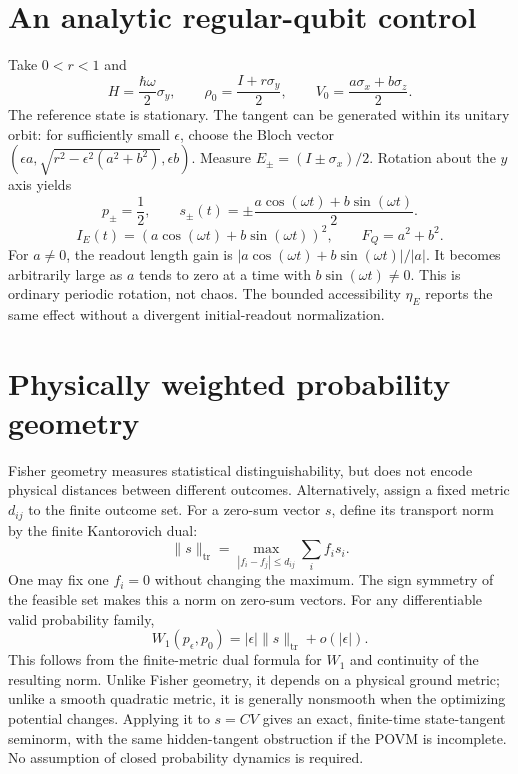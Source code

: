 \documentclass[11pt,a4paper]{article}
\begin{document}
\section{An analytic regular-qubit control}
Take $0<r<1$ and
\[H=\frac{\hbar\omega}{2}\sigma_y,\qquad\rho_0=\frac{I+r\sigma_y}{2},\qquad V_0=\frac{a\sigma_x+b\sigma_z}{2}.\]
The reference state is stationary. The tangent can be generated within its unitary orbit: for sufficiently small $\epsilon$, choose the Bloch vector $(\epsilon a,\sqrt{r^2-\epsilon^2(a^2+b^2)},\epsilon b)$. Measure $E_\pm=(I\pm\sigma_x)/2$. Rotation about the $y$ axis yields
\[p_\pm=\frac12,\qquad s_\pm(t)=\pm\frac{a\cos(\omega t)+b\sin(\omega t)}{2}.\]
\[I_E(t)=(a\cos(\omega t)+b\sin(\omega t))^2,\qquad F_Q=a^2+b^2.\]
For $a\ne0$, the readout length gain is $|a\cos(\omega t)+b\sin(\omega t)|/|a|$. It becomes arbitrarily large as $a$ tends to zero at a time with $b\sin(\omega t)\ne0$. This is ordinary periodic rotation, not chaos. The bounded accessibility $\eta_E$ reports the same effect without a divergent initial-readout normalization.
\section{Physically weighted probability geometry}
Fisher geometry measures statistical distinguishability, but does not encode physical distances between different outcomes. Alternatively, assign a fixed metric $d_{ij}$ to the finite outcome set. For a zero-sum vector $s$, define its transport norm by the finite Kantorovich dual:
\[\|s\|_{\mathrm{tr}}=\max_{|f_i-f_j|\leq d_{ij}}\sum_i f_i s_i.\]
One may fix one $f_i=0$ without changing the maximum. The sign symmetry of the feasible set makes this a norm on zero-sum vectors. For any differentiable valid probability family,
\[W_1(p_\epsilon,p_0)=|\epsilon|\|s\|_{\mathrm{tr}}+o(|\epsilon|).\]
This follows from the finite-metric dual formula for $W_1$ and continuity of the resulting norm. Unlike Fisher geometry, it depends on a physical ground metric; unlike a smooth quadratic metric, it is generally nonsmooth when the optimizing potential changes. Applying it to $s=CV$ gives an exact, finite-time state-tangent seminorm, with the same hidden-tangent obstruction if the POVM is incomplete. No assumption of closed probability dynamics is required.
\end{document}
